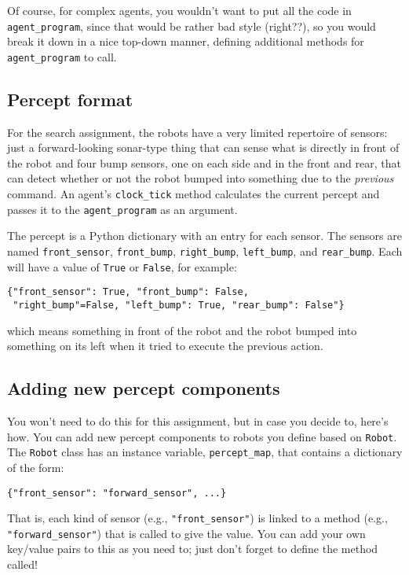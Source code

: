 \documentclass[11pt]{tufte-handout}
\begin{document}
Of course, for complex agents, you wouldn't want to put all the code in \texttt{agent\_program}, since that would be rather bad style (right??), so you would break it down in a nice top-down manner, defining additional methods for \texttt{agent\_program} to call.

\subsection{Percept format}
\label{sec:orgba54273}

For the search assignment, the robots have a very  limited repertoire of sensors: just a forward-looking sonar-type thing that can  sense what is directly in front of the robot and four bump sensors, one on each side and in the front and rear, that can detect whether or not the robot bumped into something due to the \emph{previous} command.  An agent's \texttt{clock\_tick} method calculates the current percept and passes it to the \texttt{agent\_program} as an argument.

The percept is a Python dictionary with an entry for each sensor.  The sensors are named \texttt{front\_sensor}, \texttt{front\_bump}, \texttt{right\_bump}, \texttt{left\_bump}, and \texttt{rear\_bump}.  Each will have a value of \texttt{True} or \texttt{False}, for example:
\begin{verbatim}
{"front_sensor": True, "front_bump": False,
 "right_bump"=False, "left_bump": True, "rear_bump": False"}
\end{verbatim}

\noindent which means something in front of the robot and the robot bumped into something on its left when it tried to execute the previous action.

\subsection{Adding new percept components}
\label{sec:orgcdd6d2b}
\label{orgafd29f6}

You won't need to do this for this assignment, but in case you decide to, here's how.
You can add new percept components to robots you define based on \texttt{Robot}.  The \texttt{Robot} class has an instance variable, \texttt{percept\_map}, that contains a dictionary of the form:
\begin{verbatim}
{"front_sensor": "forward_sensor", ...}
\end{verbatim}

\noindent That is, each kind of sensor (e.g., \texttt{"front\_sensor"}) is linked to a method (e.g., \texttt{"forward\_sensor"}) that is called to give the value.  You can add your own key/value pairs to this as you need to; just don't forget to define the method called!
\end{document}

